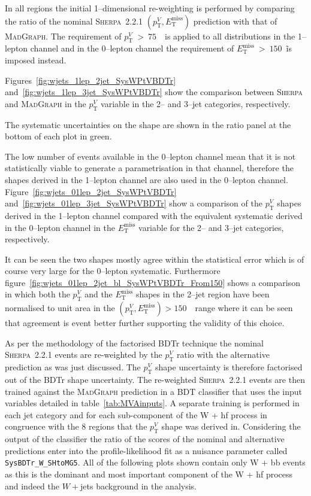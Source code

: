 In all regions the initial 1--dimensional re-weighting is performed by comparing
the ratio of the nominal \textsc{Sherpa}~2.2.1 $(p_{\mathrm{T}}^V, E_{\mathrm{T}}^{\text{miss}})$
prediction with that of \textsc{MadGraph}. The requirement of $p_{\mathrm{T}}^V~>~75$~\GeV\
is applied to all distributions in the 1--lepton channel and in the 0--lepton
channel the requirement of $E_{\mathrm{T}}^{\text{miss}}~>~150$~\GeV\~is imposed instead.

Figures~\ref{fig:wjets_1lep_2jet_SysWPtVBDTr}
and~\ref{fig:wjets_1lep_3jet_SysWPtVBDTr} show the comparison between
\textsc{Sherpa} and \textsc{MadGraph} in the  $p_{\mathrm{T}}^V$ variable in the 2-- and
3--jet categories, respectively. 

The systematic uncertainties on the shape are shown in the ratio panel at the
bottom of each plot in green.

The low number of events available in the 0--lepton channel mean that it is not
statistically viable to generate a parametrisation in that channel, therefore
the shapes derived in the 1--lepton channel are also used in the 0--lepton
channel. Figure~\ref{fig:wjets_01lep_2jet_SysWPtVBDTr}
and~\ref{fig:wjets_01lep_3jet_SysWPtVBDTr} show a comparison of the $p_{\mathrm{T}}^V$
shapes derived in the 1--lepton channel compared with the equivalent systematic
derived in the 0--lepton channel in the $E_{\mathrm{T}}^{\text{miss}}$ variable for the 2--
and 3--jet categories, respectively.

It can be seen the two shapes mostly agree within the statistical error which is
of course very large for the 0--lepton systematic. Furthermore
figure~\ref{fig:wjets_01lep_2jet_bl_SysWPtVBDTr_From150} shows  a comparison in
which both the $p_{\mathrm{T}}^V$ and the $E_{\mathrm{T}}^{\text{miss}}$ shapes in the 2--jet region
have been normalised to unit area in the $(p_{\mathrm{T}}^V, E_{\mathrm{T}}^{\text{miss}}) > 150$~\GeV\
range where it can be seen that agreement is event better further supporting the
validity of this choice.


As per the methodology of the factorised BDTr technique the nominal
\textsc{Sherpa}~2.2.1 events are re-weighted by the $p_{\mathrm{T}}^V$ ratio with the
alternative prediction as was just discussed. The $p_{\mathrm{T}}^V$ shape uncertainty is
therefore factorised out of the BDTr shape uncertainty. The re-weighted
\textsc{Sherpa}~2.2.1 events are then trained against the \textsc{MadGraph}
prediction in a BDT classifier that uses the input variables detailed in
table~\ref{tab:MVAinputs}. A separate training is performed in each jet category
and for each sub-component of the W + hf process in congruence with the 8
regions that the $p_{\mathrm{T}}^V$ shape was derived in. Considering the output of the
classifier the ratio of the scores of the nominal and alternative predictions
enter into the profile-likelihood fit as a nuisance parameter called
\texttt{SysBDTr\_W\_SHtoMG5}. All of the following plots shown contain only W +
bb events as this is the dominant and most important component of the W + hf
process and indeed the $W+$jets background in the analysis.

